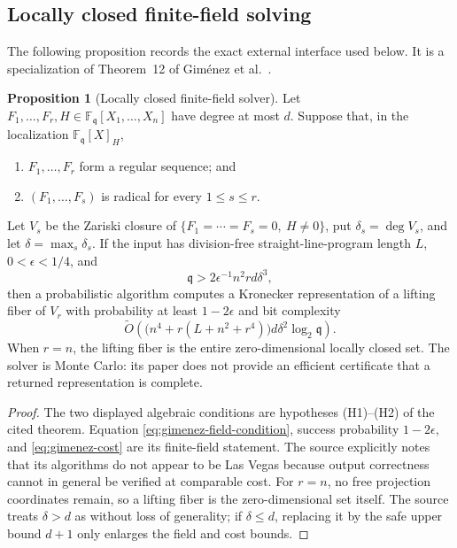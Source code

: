 \documentclass[11pt,a4paper]{article}
\theoremstyle{definition}
\newtheorem{proposition}[theorem]{Proposition}
\theoremstyle{remark}
\newcommand{\F}{\mathbb F}
\begin{document}
\subsection{Locally closed finite-field solving}\label{subsec:local-solver}

The following proposition records the exact external interface used below.  It is a specialization of Theorem~12 of Gim\'enez et al.~\cite{Gimenez2026}.

\begin{proposition}[Locally closed finite-field solver]\label{prop:gimenez-theorem}
Let $F_1,\ldots,F_r,H\in\F_{\mathfrak q}[X_1,\ldots,X_n]$ have degree at most $d$.  Suppose that, in the localization $\F_{\mathfrak q}[X]_H$,
\begin{enumerate}
\item $F_1,\ldots,F_r$ form a regular sequence; and
\item $(F_1,\ldots,F_s)$ is radical for every $1\le s\le r$.
\end{enumerate}
Let $V_s$ be the Zariski closure of
$\{F_1=\cdots=F_s=0,\ H\ne0\}$, put $\delta_s=\deg V_s$, and let $\delta=\max_s\delta_s$.  If the input has division-free straight-line-program length $L$, $0<\epsilon<1/4$, and
\begin{equation}\label{eq:gimenez-field-condition}
 \mathfrak q>2\epsilon^{-1}n^2rd\delta^3,
\end{equation}
then a probabilistic algorithm computes a Kronecker representation of a lifting fiber of $V_r$ with probability at least $1-2\epsilon$ and bit complexity
\begin{equation}\label{eq:gimenez-cost}
 \widetilde O\!\left(
   \bigl(n^4+r(L+n^2+r^4)\bigr)d\delta^2\log_2\mathfrak q
 \right).
\end{equation}
When $r=n$, the lifting fiber is the entire zero-dimensional locally closed set.  The solver is Monte Carlo: its paper does not provide an efficient certificate that a returned representation is complete.
\end{proposition}

\begin{proof}
The two displayed algebraic conditions are hypotheses (H1)--(H2) of the cited theorem.  Equation \eqref{eq:gimenez-field-condition}, success probability $1-2\epsilon$, and \eqref{eq:gimenez-cost} are its finite-field statement.  The source explicitly notes that its algorithms do not appear to be Las Vegas because output correctness cannot in general be verified at comparable cost.  For $r=n$, no free projection coordinates remain, so a lifting fiber is the zero-dimensional set itself.  The source treats $\delta>d$ as without loss of generality; if $\delta\le d$, replacing it by the safe upper bound $d+1$ only enlarges the field and cost bounds.
\end{proof}
\end{document}
